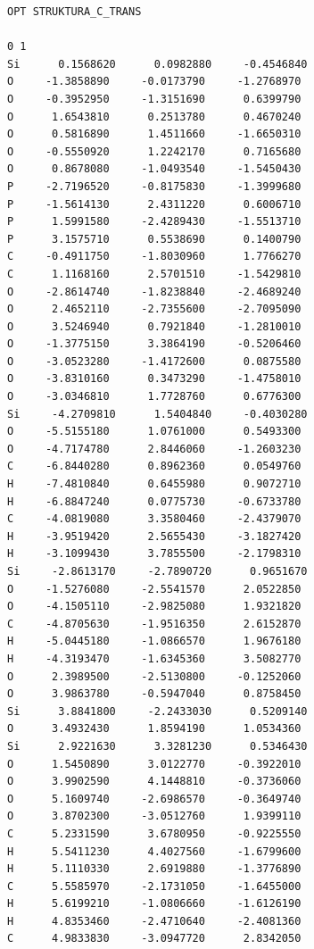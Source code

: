 \documentclass[
  digital, %
  table,   %
  lof,     %
  lot,     %
  oneside,
]{fithesis3}
\begin{document}
  \begin{lstlisting}[frame=single, caption={puvodni struktura C trans },label=DescriptiveLabel]
OPT STRUKTURA_C_TRANS

0 1
Si      0.1568620      0.0982880     -0.4546840
O     -1.3858890     -0.0173790     -1.2768970
O     -0.3952950     -1.3151690      0.6399790
O      1.6543810      0.2513780      0.4670240
O      0.5816890      1.4511660     -1.6650310
O     -0.5550920      1.2242170      0.7165680
O      0.8678080     -1.0493540     -1.5450430
P     -2.7196520     -0.8175830     -1.3999680
P     -1.5614130      2.4311220      0.6006710
P      1.5991580     -2.4289430     -1.5513710
P      3.1575710      0.5538690      0.1400790
C     -0.4911750     -1.8030960      1.7766270
C      1.1168160      2.5701510     -1.5429810
O     -2.8614740     -1.8238840     -2.4689240
O      2.4652110     -2.7355600     -2.7095090
O      3.5246940      0.7921840     -1.2810010
O     -1.3775150      3.3864190     -0.5206460
O     -3.0523280     -1.4172600      0.0875580
O     -3.8310160      0.3473290     -1.4758010
O     -3.0346810      1.7728760      0.6776300
Si     -4.2709810      1.5404840     -0.4030280
O     -5.5155180      1.0761000      0.5493300
O     -4.7174780      2.8446060     -1.2603230
C     -6.8440280      0.8962360      0.0549760
H     -7.4810840      0.6455980      0.9072710
H     -6.8847240      0.0775730     -0.6733780
C     -4.0819080      3.3580460     -2.4379070
H     -3.9519420      2.5655430     -3.1827420
H     -3.1099430      3.7855500     -2.1798310
Si     -2.8613170     -2.7890720      0.9651670
O     -1.5276080     -2.5541570      2.0522850
O     -4.1505110     -2.9825080      1.9321820
C     -4.8705630     -1.9516350      2.6152870
H     -5.0445180     -1.0866570      1.9676180
H     -4.3193470     -1.6345360      3.5082770
O      2.3989500     -2.5130800     -0.1252060
O      3.9863780     -0.5947040      0.8758450
Si      3.8841800     -2.2433030      0.5209140
O      3.4932430      1.8594190      1.0534360
Si      2.9221630      3.3281230      0.5346430
O      1.5450890      3.0122770     -0.3922010
O      3.9902590      4.1448810     -0.3736060
O      5.1609740     -2.6986570     -0.3649740
O      3.8702300     -3.0512760      1.9399110
C      5.2331590      3.6780950     -0.9225550
H      5.5411230      4.4027560     -1.6799600
H      5.1110330      2.6919880     -1.3776890
C      5.5585970     -2.1731050     -1.6455000
H      5.6199210     -1.0806660     -1.6126190
H      4.8353460     -2.4710640     -2.4081360
C      4.9833830     -3.0947720      2.8342050

\end{lstlisting}
\end{document}
